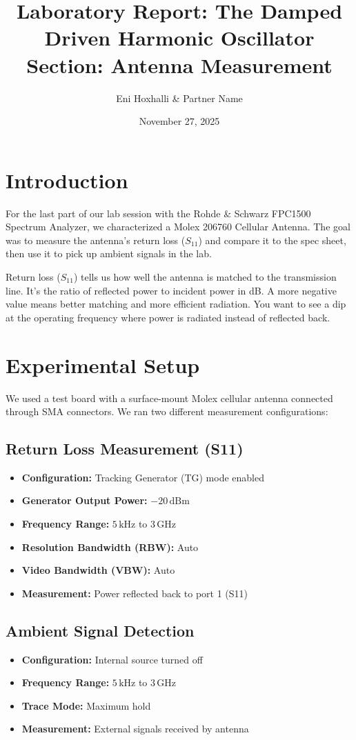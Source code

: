 \documentclass[a4paper,11pt]{article}
\title{Laboratory Report: The Damped Driven Harmonic Oscillator \\ \large Section: Antenna Measurement}
\author{Eni Hoxhalli \& Partner Name}
\date{November 27, 2025}
\begin{document}
\maketitle

\section{Introduction}

For the last part of our lab session with the Rohde \& Schwarz FPC1500 Spectrum Analyzer, we characterized a Molex 206760 Cellular Antenna. The goal was to measure the antenna's return loss ($S_{11}$) and compare it to the spec sheet, then use it to pick up ambient signals in the lab.

Return loss ($S_{11}$) tells us how well the antenna is matched to the transmission line. It's the ratio of reflected power to incident power in dB. A more negative value means better matching and more efficient radiation. You want to see a dip at the operating frequency where power is radiated instead of reflected back.

\section{Experimental Setup}

We used a test board with a surface-mount Molex cellular antenna connected through SMA connectors. We ran two different measurement configurations:

\subsection{Return Loss Measurement (S11)}
\begin{itemize}
    \item \textbf{Configuration:} Tracking Generator (TG) mode enabled
    \item \textbf{Generator Output Power:} $-20\,\text{dBm}$
    \item \textbf{Frequency Range:} $5\,\text{kHz}$ to $3\,\text{GHz}$
    \item \textbf{Resolution Bandwidth (RBW):} Auto
    \item \textbf{Video Bandwidth (VBW):} Auto
    \item \textbf{Measurement:} Power reflected back to port 1 (S11)
\end{itemize}

\subsection{Ambient Signal Detection}
\begin{itemize}
    \item \textbf{Configuration:} Internal source turned off
    \item \textbf{Frequency Range:} $5\,\text{kHz}$ to $3\,\text{GHz}$
    \item \textbf{Trace Mode:} Maximum hold
    \item \textbf{Measurement:} External signals received by antenna
\end{itemize}
\end{document}
